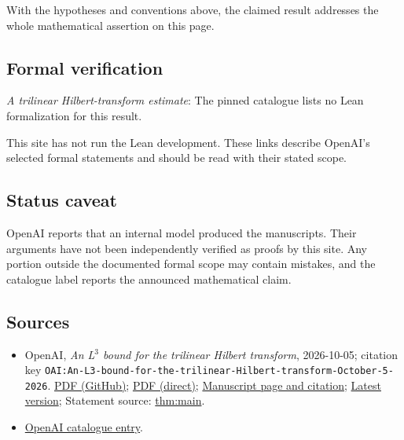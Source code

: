 \documentclass[11pt]{article}
\begin{document}
With the hypotheses and conventions above, the claimed result addresses the whole mathematical assertion on this page.

\subsection{Formal verification}
\textit{A trilinear Hilbert-transform estimate}: The pinned catalogue lists no Lean formalization for this result.

This site has not run the Lean development. These links describe OpenAI’s selected formal statements and should be read with their stated scope.

\subsection{Status caveat}
OpenAI reports that an internal model produced the manuscripts. Their arguments have not been independently verified as proofs by this site. Any portion outside the documented formal scope may contain mistakes, and the catalogue label reports the announced mathematical claim.

\subsection{Sources}
\begin{itemize}
\item OpenAI, \emph{An L\({}^{3}\) bound for the trilinear Hilbert transform}, 2026-10-05; citation key \texttt{OAI:An-L3-bound-for-the-trilinear-Hilbert-transform-October-5-2026}. \href{https://github.com/openai/math/blob/adc7f1241b42e322a6451854ab7e4b4c146bf78a/preprints/An-L3-bound-for-the-trilinear-Hilbert-transform-October-5-2026/paper.pdf}{PDF (GitHub)}; \href{https://github.com/openai/math/raw/adc7f1241b42e322a6451854ab7e4b4c146bf78a/preprints/An-L3-bound-for-the-trilinear-Hilbert-transform-October-5-2026/paper.pdf}{PDF (direct)}; \href{https://github.com/openai/math/blob/adc7f1241b42e322a6451854ab7e4b4c146bf78a/preprints/An-L3-bound-for-the-trilinear-Hilbert-transform-October-5-2026/README.md}{Manuscript page and citation}; \href{https://github.com/openai/math/blob/main/preprints/An-L3-bound-for-the-trilinear-Hilbert-transform-October-5-2026/paper.pdf}{Latest version}; Statement source: \href{https://github.com/openai/math/blob/adc7f1241b42e322a6451854ab7e4b4c146bf78a/preprints/An-L3-bound-for-the-trilinear-Hilbert-transform-October-5-2026/build/sections/introduction.tex\#L11}{thm:main}.
\item \href{https://github.com/openai/math/blob/adc7f1241b42e322a6451854ab7e4b4c146bf78a/CONTENTS.md}{OpenAI catalogue entry}.
\end{itemize}
\end{document}
